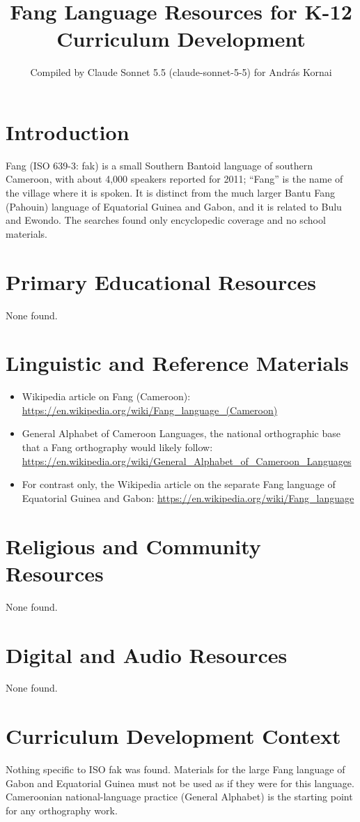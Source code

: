 \documentclass[12pt]{article}
\title{Fang Language Resources for K-12 Curriculum Development}
\author{Compiled by Claude Sonnet 5.5 (claude-sonnet-5-5) for Andr\'as Kornai}
\date{}
\begin{document}
\maketitle

\section{Introduction}
Fang (ISO 639-3: fak) is a small Southern Bantoid language of southern Cameroon, with about 4,000 speakers reported for 2011; ``Fang'' is the name of the village where it is spoken. It is distinct from the much larger Bantu Fang (Pahouin) language of Equatorial Guinea and Gabon, and it is related to Bulu and Ewondo. The searches found only encyclopedic coverage and no school materials.

\section{Primary Educational Resources}
None found.

\section{Linguistic and Reference Materials}
\begin{itemize}
\item Wikipedia article on Fang (Cameroon): \url{https://en.wikipedia.org/wiki/Fang_language_(Cameroon)}
\item General Alphabet of Cameroon Languages, the national orthographic base that a Fang orthography would likely follow: \url{https://en.wikipedia.org/wiki/General_Alphabet_of_Cameroon_Languages}
\item For contrast only, the Wikipedia article on the separate Fang language of Equatorial Guinea and Gabon: \url{https://en.wikipedia.org/wiki/Fang_language}
\end{itemize}

\section{Religious and Community Resources}
None found.

\section{Digital and Audio Resources}
None found.

\section{Curriculum Development Context}
Nothing specific to ISO fak was found. Materials for the large Fang language of Gabon and Equatorial Guinea must not be used as if they were for this language. Cameroonian national-language practice (General Alphabet) is the starting point for any orthography work.
\end{document}
